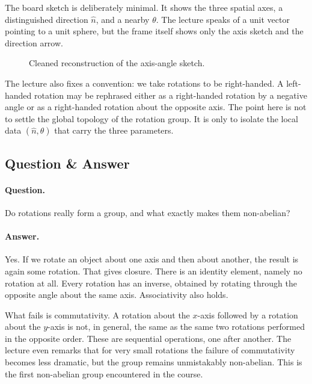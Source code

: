 The board sketch is deliberately minimal. It shows the three spatial axes, a distinguished direction \(\hat n\), and a nearby \(\theta\). The lecture speaks of a unit vector pointing to a unit sphere, but the frame itself shows only the axis sketch and the direction arrow.

\begin{figure}[htbp]
\centering
{}
\caption{Cleaned reconstruction of the axis-angle sketch.}
\end{figure}

The lecture also fixes a convention: we take rotations to be right-handed. A left-handed rotation may be rephrased either as a right-handed rotation by a negative angle or as a right-handed rotation about the opposite axis. The point here is not to settle the global topology of the rotation group. It is only to isolate the local data \((\hat n,\theta)\) that carry the three parameters.

\subsection{Question \& Answer}

\paragraph{Question.} Do rotations really form a group, and what exactly makes them non-abelian?

\paragraph{Answer.} Yes. If we rotate an object about one axis and then about another, the result is again some rotation. That gives closure. There is an identity element, namely no rotation at all. Every rotation has an inverse, obtained by rotating through the opposite angle about the same axis. Associativity also holds.

What fails is commutativity. A rotation about the \(x\)-axis followed by a rotation about the \(y\)-axis is not, in general, the same as the same two rotations performed in the opposite order. These are sequential operations, one after another. The lecture even remarks that for very small rotations the failure of commutativity becomes less dramatic, but the group remains unmistakably non-abelian. This is the first non-abelian group encountered in the course.

